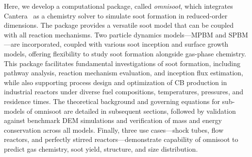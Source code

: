 



Here, we develop a computational package, called \textit{omnisoot}, which integrates Cantera~\citep{cantera} as a chemistry solver to simulate soot formation in reduced-order dimensions. The package provides a versatile soot model that can be coupled with all reaction mechanisms. Two particle dynamics models—MPBM and SPBM—are incorporated, coupled with various soot inception and surface growth models, offering flexibility to study soot formation alongside gas-phase chemistry. This package facilitates fundamental investigations of soot formation, including pathway analysis, reaction mechanism evaluation, and inception flux estimation, while also supporting process design and optimization of CB production in industrial reactors under diverse fuel compositions, temperatures, pressures, and residence times. The theoretical background and governing equations for sub-models of omnisoot are detailed in subsequent sections, followed by validation against benchmark DEM simulations and verification of mass and energy conservation across all models. Finally, three use cases—shock tubes, flow reactors, and perfectly stirred reactors—demonstrate capability of omnisoot to predict gas chemistry, soot yield, structure, and size distribution.





